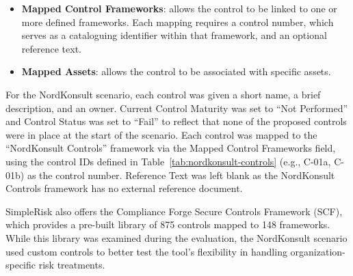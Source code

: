 \begin{itemize}
          When multiple controls are linked to a single mitigation, only the highest
          mitigation percentage among them is applied to calculate the residual risk
          score.
    \item \textbf{Mapped Control Frameworks}: allows the control to be linked to one
          or more defined frameworks. Each mapping requires a control number, which
          serves as a cataloguing identifier within that framework, and an optional
          reference text.
    \item \textbf{Mapped Assets}: allows the control to be associated with specific
          assets.
\end{itemize}
 
For the NordKonsult scenario, each control was given a short name, a brief description,
and an owner. Current Control Maturity was set to ``Not Performed'' and Control Status
was set to ``Fail'' to reflect that none of the proposed controls were in place at the
start of the scenario. Each control was mapped to the ``NordKonsult Controls'' framework
via the Mapped Control Frameworks field, using the control IDs defined in
Table~\ref{tab:nordkonsult-controls} (e.g., C-01a, C-01b) as the control number.
Reference Text was left blank as the NordKonsult Controls framework has no external
reference document.
 
SimpleRisk also offers the Compliance Forge Secure Controls Framework (SCF), which provides a pre-built library of 875 controls mapped to 148 frameworks. While this library was examined during the evaluation, the NordKonsult scenario used custom controls to better test the tool's flexibility in handling organization-specific risk treatments.
 
